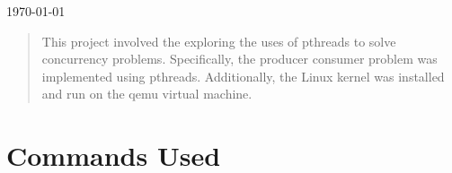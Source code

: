 \documentclass[letterpaper,draftclsnofoot,onecolumn,10pt]{article}
\begin{document}
\begin{titlepage}

{\large \today}\\[3cm] %

\begin{abstract}
This project involved the exploring the uses of pthreads to solve concurrency problems. Specifically, the producer consumer problem was implemented using pthreads. Additionally, the Linux kernel was installed and run on the qemu virtual machine.
\end{abstract}

\vfill %

\pagebreak

\end{titlepage}

\section{Commands Used}
\end{document}
